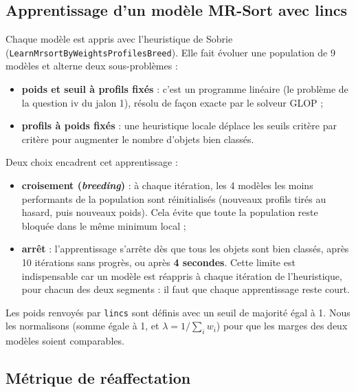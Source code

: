 \documentclass[11pt,a4paper]{article}
\begin{document}
\subsection{Apprentissage d'un modèle MR-Sort avec lincs}

Chaque modèle est appris avec l'heuristique de Sobrie (\texttt{LearnMrsortByWeightsProfilesBreed}). Elle fait
évoluer une population de 9 modèles et alterne deux sous-problèmes :
\begin{itemize}
  \item \textbf{poids et seuil à profils fixés} : c'est un programme linéaire (le problème de la question iv du
        jalon 1), résolu de façon exacte par le solveur GLOP ;
  \item \textbf{profils à poids fixés} : une heuristique locale déplace les seuils critère par critère pour
        augmenter le nombre d'objets bien classés.
\end{itemize}
Deux choix encadrent cet apprentissage :
\begin{itemize}
  \item \textbf{croisement (\emph{breeding})} : à chaque itération, les 4 modèles les moins performants de la
        population sont réinitialisés (nouveaux profils tirés au hasard, puis nouveaux poids). Cela évite que
        toute la population reste bloquée dans le même minimum local ;
  \item \textbf{arrêt} : l'apprentissage s'arrête dès que tous les objets sont bien classés, après 10 itérations
        sans progrès, ou après \textbf{4 secondes}. Cette limite est indispensable car un modèle est réappris à
        chaque itération de l'heuristique, pour chacun des deux segments : il faut que chaque apprentissage
        reste court.
\end{itemize}
Les poids renvoyés par \texttt{lincs} sont définis avec un seuil de majorité égal à 1. Nous les normalisons
(somme égale à 1, et $\lambda = 1/\sum_i w_i$) pour que les marges des deux modèles soient comparables.

\subsection{Métrique de réaffectation}
\end{document}
